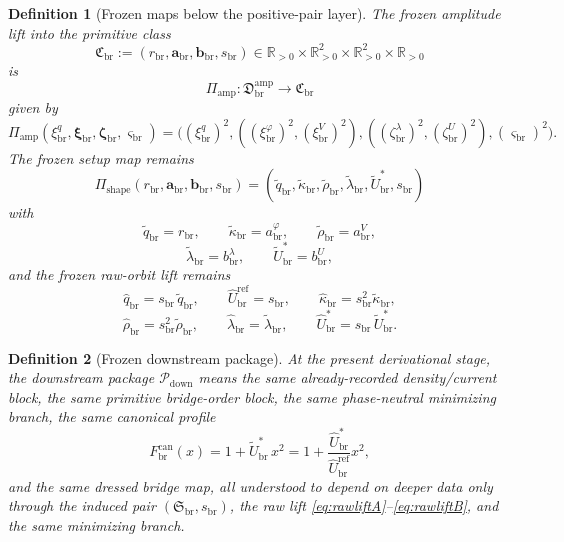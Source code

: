 \documentclass[11pt]{article}
\newcommand{\RespShapeReadout}{\widetilde q_{\mathrm{br}}}
\newcommand{\RespShapeCov}{\widetilde\kappa_{\mathrm{br}}}
\newcommand{\RespShapeRelax}{\widetilde\rho_{\mathrm{br}}}
\newcommand{\RespShapeWell}{\widetilde\lambda_{\mathrm{br}}}
\newcommand{\RespShapeEq}{\widetilde U_{\mathrm{br}}^{\ast}}
\newcommand{\RespRawReadout}{\widehat q_{\mathrm{br}}}
\newcommand{\RespRawRef}{\widehat U_{\mathrm{br}}^{\mathrm{ref}}}
\newcommand{\RespRawCov}{\widehat\kappa_{\mathrm{br}}}
\newcommand{\RespRawRelax}{\widehat\rho_{\mathrm{br}}}
\newcommand{\RespRawWell}{\widehat\lambda_{\mathrm{br}}}
\newcommand{\RespRawEq}{\widehat U_{\mathrm{br}}^{\ast}}
\newcommand{\CurvProfileCan}{F_{\mathrm{br}}^{\mathrm{can}}}
\newcommand{\DownPkg}{\mathscr P_{\mathrm{down}}}
\newcommand{\ShapeTuple}{\mathfrak S_{\mathrm{br}}}
\newcommand{\ScaleMod}{s_{\mathrm{br}}}
\newcommand{\PrimClass}{\mathfrak C_{\mathrm{br}}}
\newcommand{\PrimRead}{r_{\mathrm{br}}}
\newcommand{\PrimCovSlot}{a_{\mathrm{br}}^{\varphi}}
\newcommand{\PrimRelaxSlot}{a_{\mathrm{br}}^{V}}
\newcommand{\PrimKinetic}{\bm a_{\mathrm{br}}}
\newcommand{\PrimWellSlot}{b_{\mathrm{br}}^{\lambda}}
\newcommand{\PrimEqSlot}{b_{\mathrm{br}}^{U}}
\newcommand{\PrimAnchor}{\bm b_{\mathrm{br}}}
\newcommand{\LiftSector}{\mathfrak D_{\mathrm{br}}^{\mathrm{amp}}}
\newcommand{\DeepReadAmp}{\xi_{\mathrm{br}}^{q}}
\newcommand{\DeepCovAmp}{\xi_{\mathrm{br}}^{\varphi}}
\newcommand{\DeepRelaxAmp}{\xi_{\mathrm{br}}^{V}}
\newcommand{\DeepKinAmp}{\bm\xi_{\mathrm{br}}}
\newcommand{\DeepWellAmp}{\zeta_{\mathrm{br}}^{\lambda}}
\newcommand{\DeepEqAmp}{\zeta_{\mathrm{br}}^{U}}
\newcommand{\DeepAnchorAmp}{\bm\zeta_{\mathrm{br}}}
\newcommand{\DeepScaleAmp}{\varsigma_{\mathrm{br}}}
\newcommand{\AmpMap}{\Pi_{\mathrm{amp}}}
\newcommand{\PrimMap}{\Pi_{\mathrm{shape}}}
\newtheorem{definition}{Definition}
\begin{document}
\begin{definition}[Frozen maps below the positive-pair layer]
\label{def:frozenmaps}
The frozen amplitude lift into the primitive class
\begin{equation}
\PrimClass
:=
(\PrimRead,\PrimKinetic,\PrimAnchor,\ScaleMod)
\in
\mathbb R_{>0}\times\mathbb R_{>0}^{2}\times\mathbb R_{>0}^{2}\times\mathbb R_{>0}
\label{eq:primclass}
\end{equation}
is
\begin{equation}
\AmpMap:\LiftSector\longrightarrow\PrimClass
\label{eq:ampmap}
\end{equation}
given by
\begin{equation}
\AmpMap(\DeepReadAmp,\DeepKinAmp,\DeepAnchorAmp,\DeepScaleAmp)
=
\bigl(
(\DeepReadAmp)^{2},
((\DeepCovAmp)^{2},(\DeepRelaxAmp)^{2}),
((\DeepWellAmp)^{2},(\DeepEqAmp)^{2}),
(\DeepScaleAmp)^{2}
\bigr).
\label{eq:ampmapexplicit}
\end{equation}
The frozen setup map remains
\begin{equation}
\PrimMap(\PrimRead,\PrimKinetic,\PrimAnchor,\ScaleMod)
=
(\RespShapeReadout,\RespShapeCov,\RespShapeRelax,\RespShapeWell,\RespShapeEq,\ScaleMod)
\label{eq:primmap}
\end{equation}
with
\begin{equation}
\RespShapeReadout=\PrimRead,
\qquad
\RespShapeCov=\PrimCovSlot,
\qquad
\RespShapeRelax=\PrimRelaxSlot,
\label{eq:shapeA}
\end{equation}
\begin{equation}
\RespShapeWell=\PrimWellSlot,
\qquad
\RespShapeEq=\PrimEqSlot,
\label{eq:shapeB}
\end{equation}
and the frozen raw-orbit lift remains
\begin{equation}
\RespRawReadout=\ScaleMod\,\RespShapeReadout,
\qquad
\RespRawRef=\ScaleMod,
\qquad
\RespRawCov=\ScaleMod^{2}\RespShapeCov,
\label{eq:rawliftA}
\end{equation}
\begin{equation}
\RespRawRelax=\ScaleMod^{2}\RespShapeRelax,
\qquad
\RespRawWell=\RespShapeWell,
\qquad
\RespRawEq=\ScaleMod\,\RespShapeEq.
\label{eq:rawliftB}
\end{equation}
\end{definition}

\begin{definition}[Frozen downstream package]
\label{def:frozendown}
At the present derivational stage, the downstream package \(\DownPkg\) means the same already-recorded density/current block, the same primitive bridge-order block, the same phase-neutral minimizing branch, the same canonical profile
\begin{equation}
\CurvProfileCan(x)=1+\RespShapeEq\,x^2
=
1+\frac{\RespRawEq}{\RespRawRef}x^2,
\label{eq:profile}
\end{equation}
and the same dressed bridge map, all understood to depend on deeper data only through the induced pair \((\ShapeTuple,\ScaleMod)\), the raw lift \eqref{eq:rawliftA}--\eqref{eq:rawliftB}, and the same minimizing branch.
\end{definition}
\end{document}
